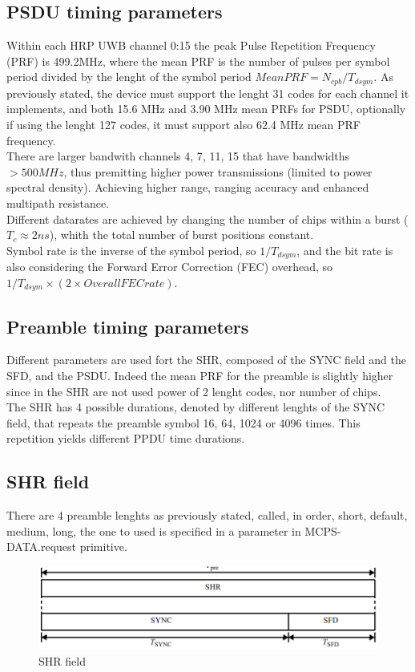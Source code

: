 \documentclass[conference]{IEEEtran}
\begin{document}
\subsection{PSDU timing parameters}
Within each HRP UWB channel {0:15} the peak Pulse Repetition Frequency (PRF) is 499.2MHz,
where the mean PRF is the number of pulses per symbol period divided by the lenght of the
symbol period $Mean PRF = N_{cpb}/T_{dsym}$.
As previously stated, the device must support the lenght 31 codes for each channel it
implements, and both 15.6 MHz and 3.90 MHz mean PRFs for PSDU, optionally if using the
lenght 127 codes, it must support also 62.4 MHz mean PRF frequency.\\
There are larger bandwith channels {4, 7, 11, 15} that
have bandwidths $>500MHz$, thus premitting higher power
transmissions (limited to power spectral density). Achieving higher range, ranging accuracy 
and enhanced multipath resistance.\\
Different datarates are achieved by changing the number of chips within a burst 
($T_{c}\approx2ns$), whith the total number of burst positions constant.\\
Symbol rate is the inverse of the symbol period, so $1/T_{dsym}$, and the bit rate is also
considering the Forward Error Correction (FEC) overhead, so 
$1/T_{dsym}\times(2 \times Overall FEC rate)$.\\

\subsection{Preamble timing parameters}
Different parameters are used fort the SHR, composed of the SYNC field and the SFD, and the
PSDU. Indeed the mean PRF for the preamble is slightly higher since in the SHR are not used
power of 2 lenght codes, nor number of chips.\\
The SHR has 4 possible durations, denoted by different lenghts of the SYNC field, that
repeats the preamble symbol 16, 64, 1024 or 4096 times. This repetition yields different PPDU
time durations.

\subsection{SHR field}
There are 4 preamble lenghts as previously stated, called, in order, short, default,
medium, long, the one to used is specified in a parameter in MCPS-DATA.request primitive.

\begin{figure}[!h]
  \centering
  \includegraphics[width=\linewidth]{SHR}
  \caption{SHR field}
  \label{fig:SHR}
\end{figure}
\end{document}
